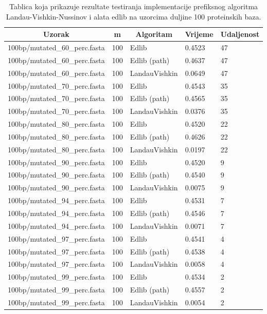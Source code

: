 \documentclass[times, utf8, zavrsni]{fer}
\begin{document}
\begin{table}[]
\centering
\begin{tabular}{|l|l|l|l|l|}
\hline
\multicolumn{1}{|c|}{Uzorak} & \multicolumn{1}{c|}{m} & \multicolumn{1}{c|}{Algoritam} & \multicolumn{1}{c|}{Vrijeme} & \multicolumn{1}{c|}{Udaljenost} \\ \hline
100bp/mutated\_60\_perc.fasta & 100 & Edlib & 0.4523 & 47 \\ \hline
100bp/mutated\_60\_perc.fasta & 100 & Edlib (path) & 0.4637 & 47 \\ \hline
100bp/mutated\_60\_perc.fasta & 100 & LandauVishkin & 0.0649 & 47 \\ \hline
100bp/mutated\_70\_perc.fasta & 100 & Edlib & 0.4543 & 35 \\ \hline
100bp/mutated\_70\_perc.fasta & 100 & Edlib (path) & 0.4565 & 35 \\ \hline
100bp/mutated\_70\_perc.fasta & 100 & LandauVishkin & 0.0376 & 35 \\ \hline
100bp/mutated\_80\_perc.fasta & 100 & Edlib & 0.4520 & 22 \\ \hline
100bp/mutated\_80\_perc.fasta & 100 & Edlib (path) & 0.4626 & 22 \\ \hline
100bp/mutated\_80\_perc.fasta & 100 & LandauVishkin & 0.0197 & 22 \\ \hline
100bp/mutated\_90\_perc.fasta & 100 & Edlib & 0.4520 & 9 \\ \hline
100bp/mutated\_90\_perc.fasta & 100 & Edlib (path) & 0.4540 & 9 \\ \hline
100bp/mutated\_90\_perc.fasta & 100 & LandauVishkin & 0.0075 & 9 \\ \hline
100bp/mutated\_94\_perc.fasta & 100 & Edlib & 0.4531 & 7 \\ \hline
100bp/mutated\_94\_perc.fasta & 100 & Edlib (path) & 0.4546 & 7 \\ \hline
100bp/mutated\_94\_perc.fasta & 100 & LandauVishkin & 0.0071 & 7 \\ \hline
100bp/mutated\_97\_perc.fasta & 100 & Edlib & 0.4541 & 4 \\ \hline
100bp/mutated\_97\_perc.fasta & 100 & Edlib (path) & 0.4538 & 4 \\ \hline
100bp/mutated\_97\_perc.fasta & 100 & LandauVishkin & 0.0058 & 4 \\ \hline
100bp/mutated\_99\_perc.fasta & 100 & Edlib & 0.4534 & 2 \\ \hline
100bp/mutated\_99\_perc.fasta & 100 & Edlib (path) & 0.4557 & 2 \\ \hline
100bp/mutated\_99\_perc.fasta & 100 & LandauVishkin & 0.0054 & 2 \\ \hline
\end{tabular}
\caption{Tablica koja prikazuje rezultate testiranja implementacije prefiksnog algoritma Landau-Vishkin-Nussinov i alata edlib na uzorcima duljine 100 proteinskih baza.}
\label{tab:resultsPrefix100}
\end{table}
\end{document}
